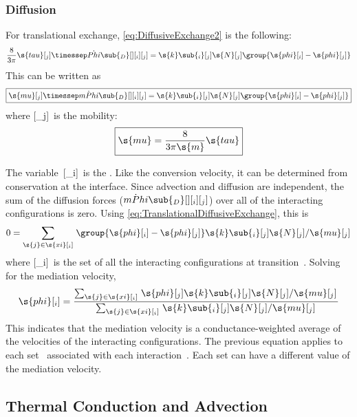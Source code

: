 \subsubsection{Diffusion}

For translational exchange, \autoref{eq:DiffusiveExchange2} is the following:
\begin{equation}
  \label{eq:TranslationalDiffusiveExchange1}
  \frac{8}{3\pi}\s{tau}[_j]\timessep\dot{Phi}\sub{_D}[ ][_i][_j] = \s{k}\sub{_i}[_j]\s{N}[_j]\group{\s{phi}[_i] - \s{phi}[_j]}
\end{equation}
This can be written as
\begin{equation}
  \label{eq:TranslationalDiffusiveExchange}
  \boxed{\s{mu}[_j]\timessep\dot{mPhi}\sub{_D}[ ][_i][_j] = \s{k}\sub{_i}[_j]\s{N}[_j]\group{\s{phi}[_i] - \s{phi}[_j]}}
\end{equation}
where [_j]~is the mobility:
\begin{equation}
  \label{eq:Mobility}
  \boxed{\s{mu} = \frac{8}{3\pi\s{m}}\s{tau}}
\end{equation}

The variable~[_i]~is the \emph{}.  Like the conversion velocity, it can be determined from conservation at the interface.  Since advection and diffusion are independent, the sum of the diffusion forces ($\dot{mPhi}\sub{_D}[ ][_i][_j]$) over all of the interacting configurations is zero.  Using \autoref{eq:TranslationalDiffusiveExchange}, this is
\begin{equation}
  0 = \sum_{\s{j} \in \s{xi}[_i]}\left.\group{\s{phi}[_i] - \s{phi}[_j]}\s{k}\sub{_i}[_j]\s{N}[_j]\middle/\s{mu}[_j]\right.
\end{equation}
where [_i]~is the set of all the interacting configurations at transition~.  Solving for the mediation velocity,
\begin{equation}
  \label{eq:MediationVelocity}
  \s{phi}[_i] = \frac{\sum_{\s{j} \in \s{xi}[_i]}\left.\s{phi}[_j]\s{k}\sub{_i}[_j]\s{N}[_j]\middle/\s{mu}[_j]\right.}{\sum_{\s{j} \in \s{xi}[_i]}\left.\s{k}\sub{_i}[_j]\s{N}[_j]\middle/\s{mu}[_j]\right.}
\end{equation}
This indicates that the mediation velocity is a conductance-weighted average of the velocities of the interacting configurations.  The previous equation applies to each set~ associated with each interaction~.  Each set can have a different value of the mediation velocity.


\subsection{Thermal Conduction and Advection}
\label{sec:ThermalExchange}

